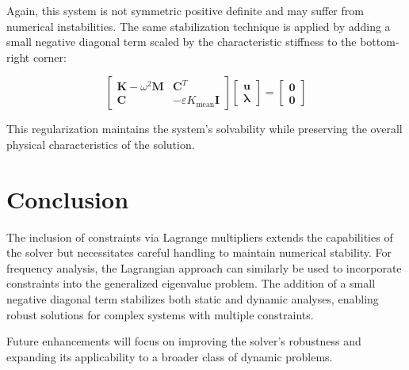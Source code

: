 Again, this system is not symmetric positive definite and may suffer from numerical instabilities. The same stabilization technique is applied by adding a small negative diagonal term scaled by the characteristic stiffness to the bottom-right corner:

\begin{equation}
\begin{bmatrix}
\mathbf{K} - \omega^2 \mathbf{M} & \mathbf{C}^T \\
\mathbf{C} & -\varepsilon K_{\text{mean}} \mathbf{I}
\end{bmatrix}
\begin{bmatrix}
\boldsymbol{u} \\
\boldsymbol{\lambda}
\end{bmatrix}
=
\begin{bmatrix}
\boldsymbol{0} \\
\boldsymbol{0}
\end{bmatrix}
\end{equation}

This regularization maintains the system's solvability while preserving the overall physical characteristics of the solution.

\section{Conclusion}

The inclusion of constraints via Lagrange multipliers extends the capabilities of the solver but necessitates careful handling to maintain numerical stability. For frequency analysis, the Lagrangian approach can similarly be used to incorporate constraints into the generalized eigenvalue problem. The addition of a small negative diagonal term stabilizes both static and dynamic analyses, enabling robust solutions for complex systems with multiple constraints.

Future enhancements will focus on improving the solver's robustness and expanding its applicability to a broader class of dynamic problems.
